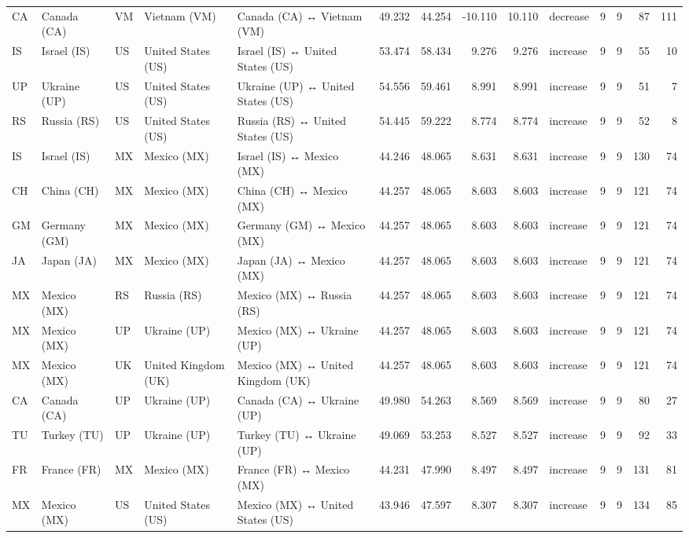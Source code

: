 \begin{tabular}{lllllrrrrlrrrr}
CA & Canada (CA) & VM & Vietnam (VM) & Canada (CA) ↔ Vietnam (VM) & 49.232 & 44.254 & -10.110 & 10.110 & decrease & 9 & 9 & 87 & 111 \\
IS & Israel (IS) & US & United States (US) & Israel (IS) ↔ United States (US) & 53.474 & 58.434 & 9.276 & 9.276 & increase & 9 & 9 & 55 & 10 \\
UP & Ukraine (UP) & US & United States (US) & Ukraine (UP) ↔ United States (US) & 54.556 & 59.461 & 8.991 & 8.991 & increase & 9 & 9 & 51 & 7 \\
RS & Russia (RS) & US & United States (US) & Russia (RS) ↔ United States (US) & 54.445 & 59.222 & 8.774 & 8.774 & increase & 9 & 9 & 52 & 8 \\
IS & Israel (IS) & MX & Mexico (MX) & Israel (IS) ↔ Mexico (MX) & 44.246 & 48.065 & 8.631 & 8.631 & increase & 9 & 9 & 130 & 74 \\
CH & China (CH) & MX & Mexico (MX) & China (CH) ↔ Mexico (MX) & 44.257 & 48.065 & 8.603 & 8.603 & increase & 9 & 9 & 121 & 74 \\
GM & Germany (GM) & MX & Mexico (MX) & Germany (GM) ↔ Mexico (MX) & 44.257 & 48.065 & 8.603 & 8.603 & increase & 9 & 9 & 121 & 74 \\
JA & Japan (JA) & MX & Mexico (MX) & Japan (JA) ↔ Mexico (MX) & 44.257 & 48.065 & 8.603 & 8.603 & increase & 9 & 9 & 121 & 74 \\
MX & Mexico (MX) & RS & Russia (RS) & Mexico (MX) ↔ Russia (RS) & 44.257 & 48.065 & 8.603 & 8.603 & increase & 9 & 9 & 121 & 74 \\
MX & Mexico (MX) & UP & Ukraine (UP) & Mexico (MX) ↔ Ukraine (UP) & 44.257 & 48.065 & 8.603 & 8.603 & increase & 9 & 9 & 121 & 74 \\
MX & Mexico (MX) & UK & United Kingdom (UK) & Mexico (MX) ↔ United Kingdom (UK) & 44.257 & 48.065 & 8.603 & 8.603 & increase & 9 & 9 & 121 & 74 \\
CA & Canada (CA) & UP & Ukraine (UP) & Canada (CA) ↔ Ukraine (UP) & 49.980 & 54.263 & 8.569 & 8.569 & increase & 9 & 9 & 80 & 27 \\
TU & Turkey (TU) & UP & Ukraine (UP) & Turkey (TU) ↔ Ukraine (UP) & 49.069 & 53.253 & 8.527 & 8.527 & increase & 9 & 9 & 92 & 33 \\
FR & France (FR) & MX & Mexico (MX) & France (FR) ↔ Mexico (MX) & 44.231 & 47.990 & 8.497 & 8.497 & increase & 9 & 9 & 131 & 81 \\
MX & Mexico (MX) & US & United States (US) & Mexico (MX) ↔ United States (US) & 43.946 & 47.597 & 8.307 & 8.307 & increase & 9 & 9 & 134 & 85 \\

\end{tabular}
